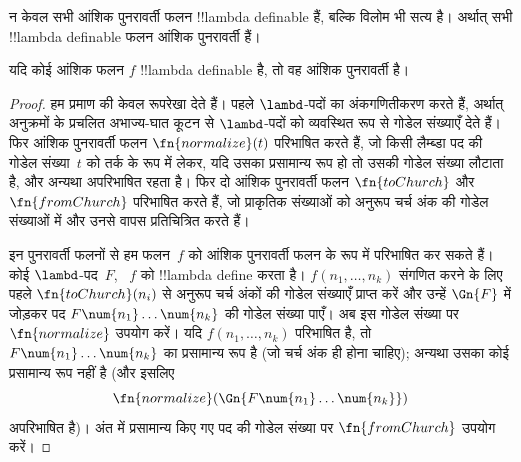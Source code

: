 \documentclass[../../../include/open-logic-section]{subfiles}
\begin{document}

न केवल सभी आंशिक पुनरावर्ती फलन !!{lambda definable} हैं, बल्कि विलोम भी
सत्य है। अर्थात् सभी !!{lambda definable} फलन आंशिक पुनरावर्ती हैं।

\begin{thm}
   यदि कोई आंशिक फलन $f$ !!{lambda
  definable} है, तो वह आंशिक पुनरावर्ती है।
\end{thm}

\begin{proof}
  हम प्रमाण की केवल रूपरेखा देते हैं। पहले $\lambd$-पदों का अंकगणितीकरण
  करते हैं, अर्थात् अनुक्रमों के प्रचलित अभाज्य-घात कूटन से $\lambd$-पदों
  को व्यवस्थित रूप से गोडेल संख्याएँ देते हैं। फिर आंशिक पुनरावर्ती फलन
  $\fn{normalize}(t)$ परिभाषित करते हैं, जो किसी लैम्ब्डा पद की गोडेल
  संख्या~$t$ को तर्क के रूप में लेकर, यदि उसका प्रसामान्य रूप हो तो उसकी
  गोडेल संख्या लौटाता है, और अन्यथा अपरिभाषित रहता है। फिर दो आंशिक
  पुनरावर्ती फलन $\fn{toChurch}$ और $\fn{fromChurch}$ परिभाषित करते हैं,
  जो प्राकृतिक संख्याओं को अनुरूप चर्च अंक की गोडेल संख्याओं में और उनसे
  वापस प्रतिचित्रित करते हैं।

  इन पुनरावर्ती फलनों से हम फलन~$f$ को आंशिक पुनरावर्ती फलन के रूप में
  परिभाषित कर सकते हैं। कोई $\lambd$-पद~$F$, ~$f$ को !!{lambda define}
  करता है। $f(n_1, \dots, n_k)$ संगणित करने के लिए पहले
  $\fn{toChurch}(n_i)$ से अनुरूप चर्च अंकों की गोडेल संख्याएँ प्राप्त करें
  और उन्हें $\Gn{F}$ में जोड़कर पद $F \num{n_1}\dots\num{n_k}$ की गोडेल
  संख्या पाएँ। अब इस गोडेल संख्या पर $\fn{normalize}$ उपयोग करें। यदि
  $f(n_1, \dots, n_k)$ परिभाषित है, तो $F
  \num{n_1}\dots\num{n_k}$ का प्रसामान्य रूप है (जो चर्च अंक ही होना
  चाहिए); अन्यथा उसका कोई प्रसामान्य रूप नहीं है (और इसलिए
  \[\fn{normalize}(\Gn{F\num{n_1}\dots\num{n_k}})\] अपरिभाषित है)। अंत
  में प्रसामान्य किए गए पद की गोडेल संख्या पर $\fn{fromChurch}$ उपयोग करें।
\end{proof}
\end{document}
